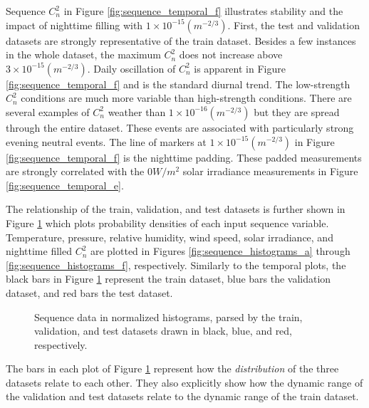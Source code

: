 Sequence $C_{n}^{2}$ in Figure \ref{fig:sequence_temporal_f} illustrates stability and the impact of nighttime filling with $1 \times 10^{-15} (m^{-2/3})$. First, the test and validation datasets are strongly representative of the train dataset. Besides a few instances in the whole dataset, the maximum $C_{n}^{2}$ does not increase above $3 \times 10^{-15} (m^{-2/3})$. Daily oscillation of $C_{n}^{2}$ is apparent in Figure \ref{fig:sequence_temporal_f} and is the standard diurnal trend. The low-strength $C_{n}^{2}$ conditions are much more variable than high-strength conditions. There are several examples of $C_{n}^{2}$ weather than $1 \times 10^{-16} (m^{-2/3})$ but they are spread through the entire dataset. These events are associated with particularly strong evening neutral events. The line of markers at $1 \times 10^{-15} (m^{-2/3})$ in Figure \ref{fig:sequence_temporal_f} is the nighttime padding. These padded measurements are strongly correlated with the $0 W/m^{2}$ solar irradiance measurements in Figure \ref{fig:sequence_temporal_e}.

The relationship of the train, validation, and test datasets is further shown in Figure \ref{fig:sequence_histograms} which plots probability densities of each input sequence variable. Temperature, pressure, relative humidity, wind speed, solar irradiance, and nighttime filled $C_{n}^{2}$ are plotted in Figures \ref{fig:sequence_histograms_a} through \ref{fig:sequence_histograms_f}, respectively. Similarly to the temporal plots, the black bars in Figure \ref{fig:sequence_histograms} represent the train dataset, blue bars the validation dataset, and red bars the test dataset.
\begin{figure}[p!]
	\centering
	\hfill
	\hfill
	\hfill
	\caption{Sequence data in normalized histograms, parsed by the train, validation, and test datasets drawn in black, blue, and red, respectively.}
	\label{fig:sequence_histograms}
\end{figure}
The bars in each plot of Figure \ref{fig:sequence_histograms} represent how the \emph{distribution} of the three datasets relate to each other. They also explicitly show how the dynamic range of the validation and test datasets relate to the dynamic range of the train dataset.

